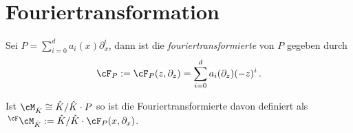 \section{Fouriertransformation}
\begin{defn}[Fouriertransformation]
Sei $P=\sum_{i=0}^da_i(x)\partial_x^i$, dann ist die
\emph{fouriertransformierte} von $P$ gegeben durch
\[
\cF_P:=\cF_P(z,\partial_z)=\sum_{i=0}^da_i(\partial_z)(-z)^i \,.
\]
\begin{comment}
\cite[Def 3.1]{Bloch_localfourier}
\cite{GarciaLopez04}
\cite[Def 6.1]{ZulaBarbara}
\end{comment}
\end{defn}
\begin{defn} %
Ist $\cM_{\hat K}\cong\hat K / \hat K \cdot P$ so ist die Fouriertransformierte
davon definiert als  $\,^\cF\cM_{\hat K}:=\hat K / \hat K \cdot
\cF_P(x,\partial_x)$.
\end{defn}
